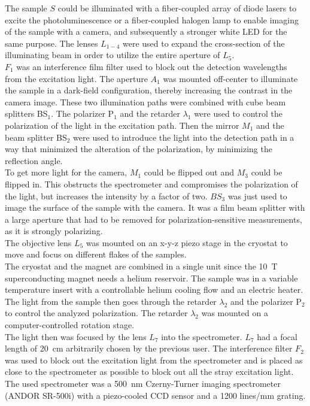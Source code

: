 \documentclass[
	twoside,
	parskip=half,
	a4paper,
]{scrbook}
\begin{document}
The sample $S$ could be illuminated with a fiber-coupled array of diode lasers to excite the photoluminescence or a fiber-coupled halogen lamp to enable imaging of the sample with a camera, and subsequently a stronger white LED for the same purpose.
The lenses $L_{1-4}$ were used to expand the cross-section of the illuminating beam in order to utilize the entire aperture of $L_5$.\\
$F_1$ was an interference film filter used to block out the detection wavelengths from the excitation light.
The aperture $A_1$ was mounted off-center to illuminate the sample in a dark-field configuration, thereby increasing the contrast in the camera image.
These two illumination paths were combined with cube beam splitters BS$_1$.
The polarizer P$_1$ and the retarder $\lambda_1$ were used to control the polarization of the light in the excitation path.
Then the mirror $M_1$ and the beam splitter BS$_2$ were used to introduce the light into the detection path in a way that minimized the alteration of the polarization, by minimizing the reflection angle.\\
To get more light for the camera, $M_1$ could be flipped out and $M_3$ could be flipped in.
This obstructs the spectrometer and compromises the polarization of the light, but increases the intensity by a factor of two.
$BS_3$ was just used to image the surface of the sample with the camera. 
It was a film beam splitter with a large aperture that had to be removed for polarization-sensitive measurements, as it is strongly polarizing.\\
The objective lens $L_5$ was mounted on an x-y-z piezo stage in the cryostat to move and focus on different flakes of the samples.\\
The cryostat and the magnet are combined in a single unit since the \SI{10}{T} superconducting magnet needs a helium reservoir.
The sample was in a variable temperature insert with a controllable helium cooling flow and an electric heater.\\
The light from the sample then goes through the retarder $\lambda_2$ and the polarizer P$_2$ to control the analyzed polarization.
The retarder $\lambda_2$ was mounted on a computer-controlled rotation stage.\\
The light then was focused by the lens $L_7$ into the spectrometer.
$L_7$ had a focal length of \SI{20}{cm} arbitrarily chosen by the previous user.
The interference filter $F_2$ was used to block out the excitation light from the spectrometer and is placed as close to the spectrometer as possible to block out all the stray excitation light.\\
The used spectrometer was a \SI{500}{nm} Czerny-Turner imaging spectrometer (ANDOR SR-500i) with a piezo-cooled CCD sensor and a 1200 lines/mm grating.
\end{document}
